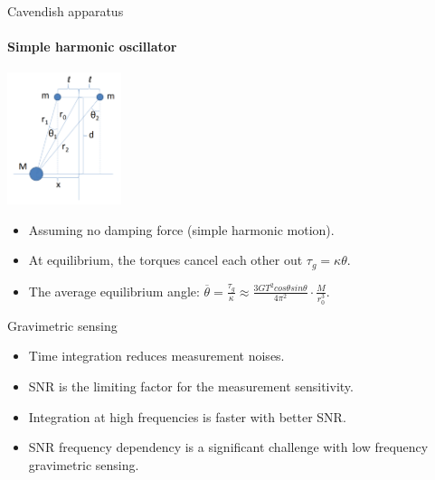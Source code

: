 \documentclass{beamer}
\begin{document}
\begin{frame}{Cavendish apparatus}
	\framesubtitle{Simple harmonic oscillator}
	\begin{center}		
		\includegraphics[width=0.25\textwidth,keepaspectratio]{Cavendish apparatus.PNG}
    \end{center}
	\begin{itemize}
		\item Assuming no damping force (simple harmonic motion).
		\item At equilibrium, the torques cancel each other out $\tau_g =  \kappa\theta$.
		\item The average equilibrium angle: $\overline{\theta} = \frac{\tau_g}{\kappa} \approx \frac{3GT^2cos\theta sin\theta}{4\pi^2 } \cdot \frac{M}{r_0^3}$.
		
	\end{itemize}
\end{frame}
\begin{frame}{Gravimetric sensing}
	
	
	\begin{itemize}
		\item Time integration reduces measurement noises. 
		\item SNR is the limiting factor for the measurement sensitivity.		
		\pause
		\item Integration at high frequencies is faster with better SNR.
		\item SNR frequency dependency is a significant challenge with low frequency gravimetric sensing.

	\end{itemize}
\end{frame}
\end{document}
